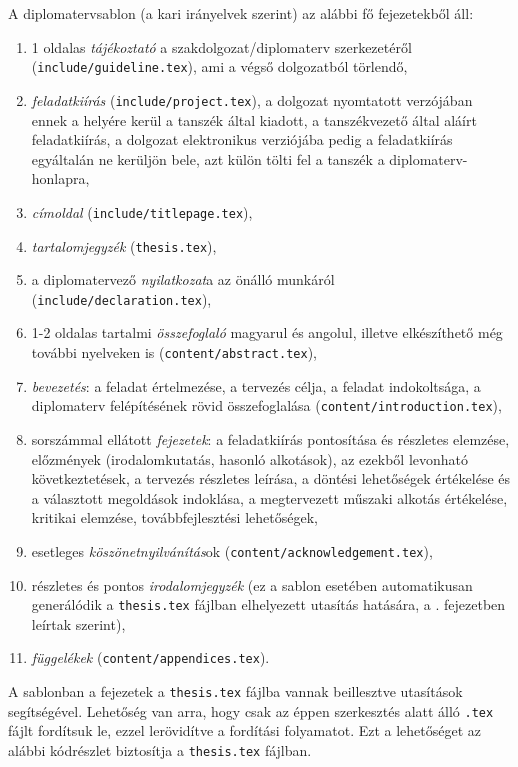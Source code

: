 A diplomatervsablon (a kari irányelvek szerint) az alábbi fő fejezetekből áll:
\begin{enumerate}
	\item 1 oldalas \emph{tájékoztató} a szakdolgozat/diplomaterv szerkezetéről (\verb+include/guideline.tex+), ami a végső dolgozatból törlendő,
	\item \emph{feladatkiírás} (\verb+include/project.tex+), a dolgozat nyomtatott verzójában ennek a helyére kerül a tanszék által kiadott, a tanszékvezető által aláírt feladatkiírás, a dolgozat elektronikus verziójába pedig a feladatkiírás egyáltalán ne kerüljön bele, azt külön tölti fel a tanszék a diplomaterv-honlapra,
	\item \emph{címoldal} (\verb+include/titlepage.tex+),
	\item \emph{tartalomjegyzék} (\verb+thesis.tex+),
	\item a diplomatervező \emph{nyilatkozat}a az önálló munkáról (\verb+include/declaration.tex+),
	\item 1-2 oldalas tartalmi \emph{összefoglaló} magyarul és angolul, illetve elkészíthető még további nyelveken is (\verb+content/abstract.tex+),
	\item \emph{bevezetés}: a feladat értelmezése, a tervezés célja, a feladat indokoltsága, a diplomaterv felépítésének rövid összefoglalása (\verb+content/introduction.tex+),
	\item sorszámmal ellátott \emph{fejezetek}: a feladatkiírás pontosítása és részletes elemzése, előzmények (irodalomkutatás, hasonló alkotások), az ezekből levonható következtetések, a tervezés részletes leírása, a döntési lehetőségek értékelése és a választott megoldások indoklása, a megtervezett műszaki alkotás értékelése, kritikai elemzése, továbbfejlesztési lehetőségek,
	\item esetleges \emph{köszönetnyilvánítás}ok (\verb+content/acknowledgement.tex+),
	\item részletes és pontos \emph{irodalomjegyzék} (ez a sablon esetében automatikusan generálódik a \verb+thesis.tex+ fájlban elhelyezett \verb++ utasítás hatására, a . fejezetben leírtak szerint),
	\item \emph{függelékek} (\verb+content/appendices.tex+).
\end{enumerate}

A sablonban a fejezetek a \verb+thesis.tex+ fájlba vannak beillesztve \verb++ utasítások segítségével. Lehetőség van arra, hogy csak az éppen szerkesztés alatt álló \verb+.tex+ fájlt fordítsuk le, ezzel lerövidítve a fordítási folyamatot. Ezt a lehetőséget az alábbi kódrészlet biztosítja a \verb+thesis.tex+ fájlban.
\begin{lstlisting}

\end{lstlisting}


